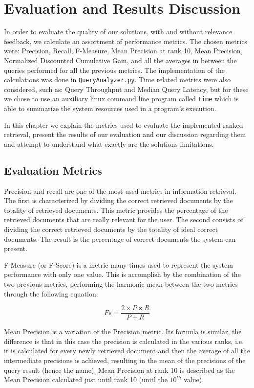 \documentclass[12pt]{article}
\begin{document}
\newpage
\section{Evaluation and Results Discussion}

In order to evaluate the quality of our solutions, with and without relevance 
feedback, we calculate an assortment of performance metrics.
The chosen metrics were: Precision, Recall, F-Measure, Mean Precision at rank 10, 
Mean Precision, Normalized Discounted Cumulative Gain, and all the averages in 
between the queries performed for all the previous metrics.
The implementation of the calculations was done in \texttt{QueryAnalyzer.py}.
Time related metrics were also considered, such as: Query Throughput and Median 
Query Latency, but for these we chose to use an auxiliary linux command line 
program called \texttt{time} which is able to summarize the system resources 
used in a program's execution.

In this chapter we explain the metrics used to evaluate the implemented ranked
retrieval, present the results of our evaluation and our discussion regarding 
them and attempt to understand what exactly are the solutions limitations.

\subsection{Evaluation Metrics} \label{metrics}

Precision and recall are one of the most used metrics in information retrieval.
The first is characterized by dividing the correct retrieved documents by the 
totality of retrieved documents. 
This metric provides the percentage of the retrieved documents that are really 
relevant for the user.
The second consists of dividing the correct retrieved documents by the totality 
of ideal correct documents. 
The result is the percentage of correct documents the system can present.

F-Measure (or F-Score) is a metric many times used to represent the system 
performance with only one value. 
This is accomplish by the combination of the two previous metrics, performing 
the harmonic mean between the two metrics through the following equation:

\begin{equation}
  Fs = \frac{2 \times P \times R}{P + R}
\end{equation}

Mean Precision is a variation of the Precision metric. 
Its formula is similar, the difference is that in this case the precision 
is calculated in the various ranks, i.e. it is calculated for every newly 
retrieved document and then the average of all the intermediate precisions 
is achieved, resulting in the mean of the precisions of the query result
(hence the name).
Mean Precision at rank 10 is described as the Mean Precision calculated just 
until rank 10 (unitl the $10^{th}$ value).
\end{document}
